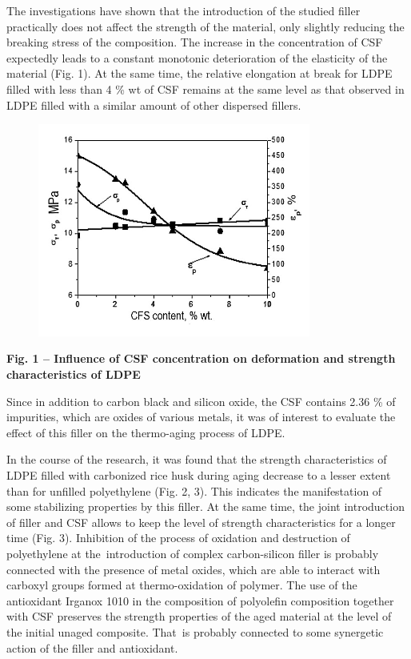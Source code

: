 The investigations have shown that the introduction of the studied
filler practically does not affect the strength of the material, only
slightly reducing the breaking stress of the composition. The increase
in the concentration of CSF expectedly leads to a constant monotonic
deterioration of the elasticity of the material (Fig. 1). At the same
time, the relative elongation at break for LDPE filled with less than 4
\% wt of CSF remains at the same level as that observed in LDPE filled
with a similar amount of other dispersed fillers.

\begin{figure}[H]
	\centering
	\includegraphics[width=0.8\textwidth]{media/chem/image19}
	\caption*{}
\end{figure}


{\bfseries Fig. 1 -- Influence of CSF concentration on deformation and
strength characteristics of LDPE}

Since in addition to carbon black and silicon oxide, the CSF contains
2.36 \% of impurities, which are oxides of various metals, it was of
interest to evaluate the effect of this filler on the thermo-aging
process of LDPE.

In the course of the research, it was found that the strength
characteristics of LDPE filled with carbonized rice husk during aging
decrease to a lesser extent than for unfilled polyethylene (Fig. 2, 3).
This indicates the manifestation of some stabilizing properties by this
filler. At the same time, the joint introduction of filler and CSF
allows to keep the level of strength characteristics for a longer time
(Fig. 3). Inhibition of the process of oxidation and destruction of
polyethylene at the~introduction of complex carbon-silicon filler is
probably connected with the presence of metal oxides, which are able to
interact with carboxyl groups formed at thermo-oxidation of polymer. The
use of the antioxidant Irganox 1010 in the composition of polyolefin
composition together with CSF preserves the strength properties of the
aged material at the level of the initial unaged composite. That~is
probably connected to some synergetic action of the filler and
antioxidant.


